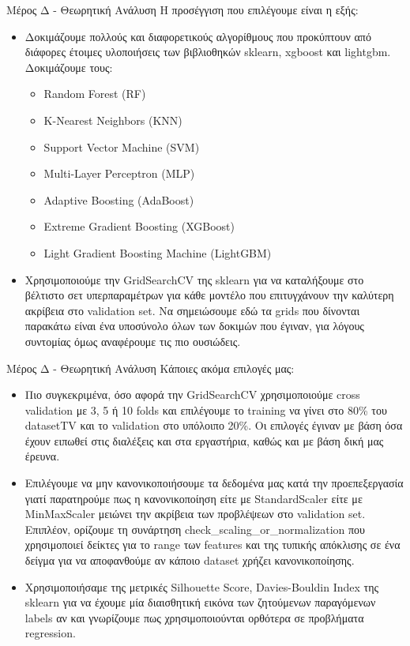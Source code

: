 \documentclass{beamer}
\begin{document}
\begin{frame}{Μέρος Δ - Θεωρητική Ανάλυση}
    Η προσέγγιση που επιλέγουμε είναι η εξής:
    \begin{itemize}
        \item Δοκιμάζουμε πολλούς και διαφορετικούς αλγορίθμους που προκύπτουν από διάφορες έτοιμες υλοποιήσεις των βιβλιοθηκών sklearn, xgboost και lightgbm. Δοκιμάζουμε τους: \begin{itemize}
            \item Random Forest (RF)
            \item K-Nearest Neighbors (KNN)
            \item Support Vector Machine (SVM)
            \item Multi-Layer Perceptron (MLP)
            \item Adaptive Boosting (AdaBoost)
            \item Extreme Gradient Boosting (XGBoost)
            \item Light Gradient Boosting Machine (LightGBM)
        \end{itemize}
        \item Χρησιμοποιούμε την GridSearchCV της sklearn για να καταλήξουμε στο βέλτιστο σετ υπερπαραμέτρων για κάθε μοντέλο που επιτυγχάνουν την καλύτερη ακρίβεια στο validation set. Να σημειώσουμε εδώ τα grids που δίνονται παρακάτω είναι ένα υποσύνολο όλων των δοκιμών που έγιναν, για λόγους συντομίας όμως αναφέρουμε τις πιο ουσιώδεις.
    \end{itemize}

\end{frame}

\begin{frame}{Μέρος Δ - Θεωρητική Ανάλυση}
\vspace{-0.2cm}
Κάποιες ακόμα επιλογές μας:
\begin{itemize}
    \item  Πιο συγκεκριμένα, όσο αφορά την GridSearchCV χρησιμοποιούμε cross validation με 3, 5 ή 10 folds και επιλέγουμε το training να γίνει στο 80\% του datasetTV και το validation στο υπόλοιπο 20\%. Οι επιλογές έγιναν με βάση όσα έχουν ειπωθεί στις διαλέξεις και στα εργαστήρια, καθώς και με βάση δική μας έρευνα.
    \item Επιλέγουμε να μην κανονικοποιήσουμε τα δεδομένα μας κατά την προεπεξεργασία γιατί παρατηρούμε πως η κανονικοποίηση είτε με StandardScaler είτε με MinMaxScaler μειώνει την ακρίβεια των προβλέψεων στο validation set. Επιπλέον, ορίζουμε τη συνάρτηση check\_scaling\_or\_normalization που χρησιμοποιεί δείκτες για το range των features και της τυπικής απόκλισης σε ένα δείγμα για να αποφανθούμε αν κάποιο dataset χρήζει κανονικοποίησης.
    \item Χρησιμοποιήσαμε της μετρικές Silhouette Score, Davies-Bouldin Index της sklearn για να έχουμε μία διαισθητική εικόνα των ζητούμενων παραγόμενων labels αν και γνωρίζουμε πως χρησιμοποιούνται ορθότερα σε προβλήματα regression.
        \end{itemize}

\end{frame}
\end{document}
